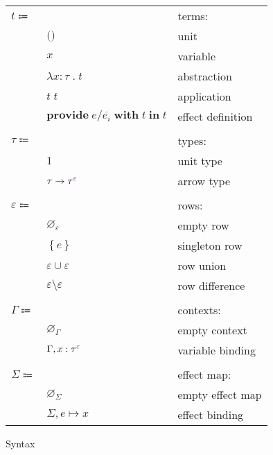 \documentclass[12pt]{article}
\newcommand\anno[2]{#1 : #2}
\newcommand\term{t}
\newcommand\eUnit{\texttt{()}}
\newcommand\eVar{x}
\newcommand\eAbs[2]{\lambda #1 \; . \; #2}
\newcommand\eApp[2]{#1 \; #2}
\newcommand\eProvide[4]{\textbf{provide} \; #1 / #2 \; \textbf{with} \; #3 \; \textbf{in} \; #4}
\newcommand\type{\tau}
\newcommand\tUnit{1}
\newcommand\tArrow[2]{#1 \rightarrow #2}
\newcommand\tEmbellished[2]{{#1}^{\textcolor{violet}{#2}}}
\newcommand\row{\varepsilon}
\newcommand\rEmpty{\varnothing_{\row}}
\newcommand\rSingleton[1]{\left\{ #1 \right\}}
\newcommand\rUnion[2]{#1 \cup #2}
\newcommand\rDiff[2]{#1 \setminus #2}
\newcommand\context{\Gamma}
\newcommand\cEmpty{\varnothing_{\context}}
\newcommand\cExtend[2]{#1, #2}
\newcommand\effect{e}
\newcommand\effectMap{\Sigma}
\newcommand\emMap[2]{#1 \mapsto #2}
\newcommand\emEmpty{\varnothing_{\effectMap}}
\newcommand\emExtend[2]{#1, #2}
\begin{document}
      \begin{figure}[H]
        \begin{mdframed}[backgroundcolor=none]
          \begin{center}
            \begin{tabular}{l l l}
              $\term \Coloneqq $ & & terms: \\
              & $\eUnit$ & unit \\
              & $\eVar$ & variable \\
              & $\eAbs{\anno{\eVar}{\type}}{\term}$ & abstraction \\
              & $\eApp{\term}{\term}$ & application \\
              & $\eProvide{\effect}{\overline{\effect_i}}{\term}{\term}$ & effect definition \\
              \\
              $\type \Coloneqq$ & & types: \\
              & $\tUnit$ & unit type \\
              & $\tArrow{\type}{\tEmbellished{\type}{\row}}$ & arrow type \\
              \\
              $\row \Coloneqq$ & & rows: \\
              & $\rEmpty$ & empty row \\
              & $\rSingleton{\effect}$ & singleton row \\
              & $\rUnion{\row}{\row}$ & row union \\
              & $\rDiff{\row}{\row}$ & row difference \\
              \\
              $\context \Coloneqq$ & & contexts: \\
              & $\cEmpty$ & empty context \\
              & $\cExtend{\context}{\anno{\eVar}{\tEmbellished{\type}{\row}}}$ & variable binding \\
              \\
              $\effectMap \Coloneqq$ & & effect map: \\
              & $\emEmpty$ & empty effect map \\
              & $\emExtend{\effectMap}{\emMap{\effect}{\eVar}}$ & effect binding \\
            \end{tabular}
          \end{center}

          \caption{Syntax}\label{fig:syntax}
        \end{mdframed}
      \end{figure}
\end{document}
